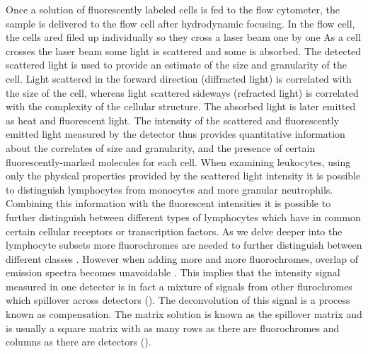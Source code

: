 Once a solution of fluorescently labeled cells is fed to the flow cytometer,
the sample is delivered to the flow cell after hydrodynamic focusing.
In the flow cell, the cells ared filed up individually so they cross a laser beam one by one \citep{Shapiro:2003vq}
As a cell crosses the laser beam some light is scattered and some is absorbed. The detected scattered light is used to provide an estimate of the size and granularity of the cell.
Light scattered in the forward direction (diffracted light) is correlated with the size of the cell, whereas light scattered sideways (refracted light) is correlated with the complexity of the cellular structure.
The absorbed light is later emitted as heat and fluorescent light.
The intensity of the scattered and fluorescently emitted light measured by the detector thus provides quantitative information about the correlates of size and granularity, and the presence of certain fluorescently-marked molecules for each cell.
When examining leukocytes, using only the physical properties provided by the scattered light intensity it is possible to distinguish lymphocytes from monocytes and more granular neutrophils.
Combining this information with the fluorescent intensities it is possible to further distinguish between different types of lymphocytes which have in common certain cellular receptors or transcription factors.
As we delve deeper into the lymphocyte subsets more fluorochromes are needed to further distinguish between different classes \citep{Perfetto:2004cy}.
However when adding more and more fluorochromes, overlap of emission spectra becomes unavoidable \citep{Roederer:2001vi}.
This implies that the intensity signal measured in one detector is in fact a mixture of signals from other flurochromes which spillover across detectors ().
The deconvolution of this signal is a process known as compensation.
The matrix solution is known as the spillover matrix and is usually a square matrix with as many rows as there are fluorochromes and columns as there are detectors
().

